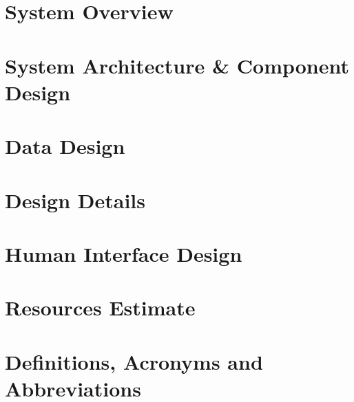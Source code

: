 \documentclass[10pt,a4paper,titlepage]{article}
\begin{document}
	\section{System Overview}
		
	\newpage
	\section{System Architecture \& Component Design}
		
	\section{Data Design}
		
	\newpage
	\section{Design Details}
		
	\newpage
	\section{Human Interface Design}
		
	\newpage
	\section{Resources Estimate}
		
	\newpage
	\section{Definitions, Acronyms and Abbreviations}
			
\end{document}
